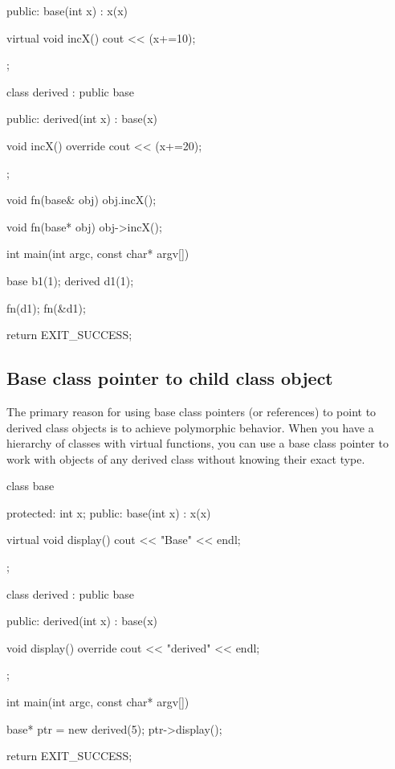 \documentclass{report}
\begin{document}
\begin{concept}
\begin{cppcode}
{        public: 
            base(int x) : x(x) {}

            virtual void incX() { cout << (x+=10); }
        };

        class derived : public base {
        public: 
            derived(int x) : base(x) {}

            void incX() override{
                cout << (x+=20);
            }
        };

        void fn(base& obj) { obj.incX(); }

        void fn(base* obj) { obj->incX(); }

        int main(int argc, const char* argv[]) {

            base b1(1);
            derived d1(1);

            fn(d1);
            fn(&d1);

            return EXIT_SUCCESS;
        }
    \end{cppcode}
    \bigbreak \noindent 
    
    
    \pagebreak
    \subsection{Base class pointer to child class object}
    \bigbreak \noindent 
    The primary reason for using base class pointers (or references) to point to derived class objects is to achieve polymorphic behavior. When you have a hierarchy of classes with virtual functions, you can use a base class pointer to work with objects of any derived class without knowing their exact type.
    \bigbreak \noindent 
    \begin{cppcode}
class base {
protected:
    int x;
public: 
    base(int x) : x(x) {}

    virtual void display() {
        cout << "Base" << endl;
    }

};

class derived : public base {
public: 
    derived(int x) : base(x) {}

    void display() override{
        cout << "derived" << endl;
    }

};

int main(int argc, const char* argv[]) {

    base* ptr = new derived(5);
    ptr->display();


    return EXIT_SUCCESS;
}
    \end{cppcode}
    

\end{concept}
\end{document}
